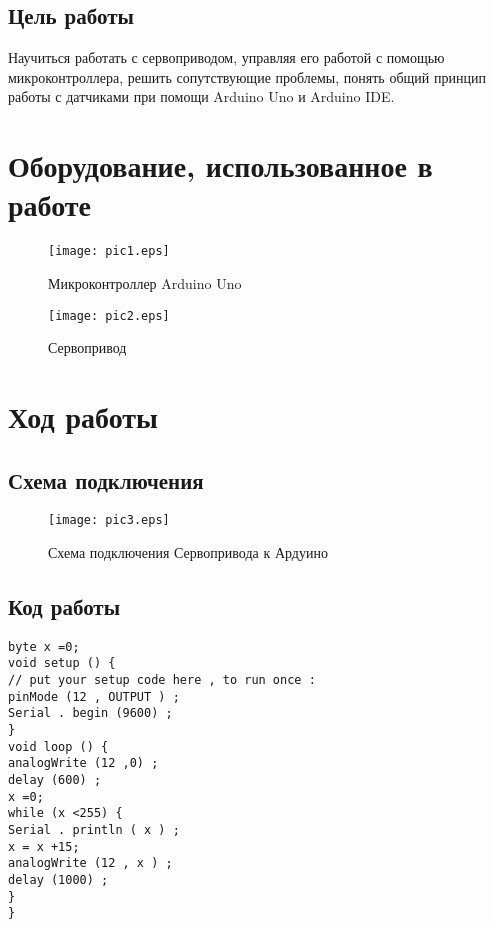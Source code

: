\documentclass[12pt,a4paper]{scrartcl}
\begin{document}
\subsection{Цель работы}
Научиться работать с сервоприводом, управляя его работой с помощью микроконтроллера, решить сопутствующие проблемы, понять общий принцип работы с датчиками при помощи Arduino Uno и Arduino IDE.

 	\newpage
 
\section{Оборудование, использованное в работе}
\begin{figure}[h!]  
	\centering
	\texttt{[image: pic1.eps]} %
	\caption{Микроконтроллер Arduino Uno} 
	\label{image:pic1} %
\end{figure}	
\begin{figure}[h!]  
	\centering
	\texttt{[image: pic2.eps]} %
	\caption{Сервопривод} 
	\label{image:pic2} %
\end{figure}
  \newpage
  \section{Ход работы}
  \subsection{Схема подключения}
  \begin{figure}[h!]  
  	\centering
  	\texttt{[image: pic3.eps]} %
  	\caption{Схема подключения Сервопривода к Ардуино} 
  	\label{image:pic3}
  \end{figure}
  \subsection{Код работы}
 \begin{verbatim}
byte x =0;
void setup () {
// put your setup code here , to run once :
pinMode (12 , OUTPUT ) ;
Serial . begin (9600) ;
}
void loop () {
analogWrite (12 ,0) ;
delay (600) ;
x =0;
while (x <255) {
Serial . println ( x ) ;
x = x +15;
analogWrite (12 , x ) ;
delay (1000) ;
}
}

 \end{verbatim}
  \newpage
\end{document}
